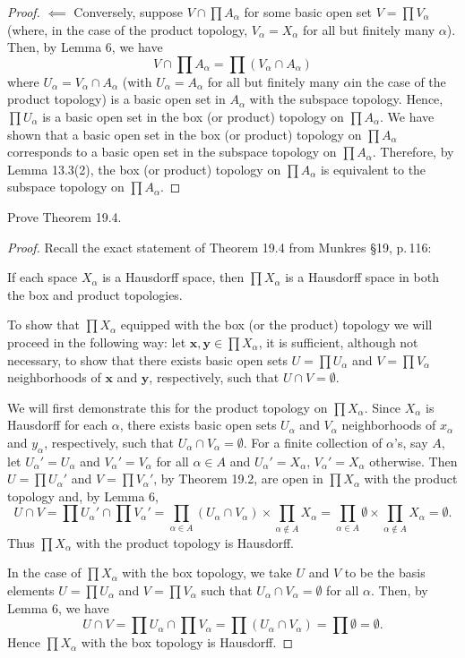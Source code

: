 \begin{proof}
$\impliedby$ Conversely, suppose $V\cap\prod A_\alpha$ for some
basic open set $V=\prod V_\alpha$ (where, in the case of the
product topology, $V_\alpha=X_\alpha$ for all but finitely many
$\alpha$). Then, by Lemma 6, we have
\[
V\cap\prod A_\alpha=\prod\left(V_\alpha\cap A_\alpha\right)
\]
where $U_\alpha=V_\alpha\cap A_\alpha$ (with $U_\alpha=A_\alpha$
for all but finitely many $\alpha$in the case of the product
topology) is a basic open set in $A_\alpha$ with the subspace
topology. Hence, $\prod U_\alpha$ is a basic open set in the
box (or product) topology on $\prod A_\alpha$. We have shown that
a basic open set in the box (or product) topology on $\prod
A_\alpha$ corresponds to a basic open set in the subspace
topology on $\prod A_\alpha$. Therefore, by Lemma 13.3(2), the
box (or product) topology on $\prod A_\alpha$ is equivalent to
the subspace topology on $\prod A_\alpha$.
\end{proof}
\newpage
\begin{problem}[Munkres \S19, p.\,118, \#3]
Prove Theorem 19.4.
\end{problem}
\begin{proof}
Recall the exact statement of Theorem 19.4 from Munkres \S19,
p.\,116:
\begin{theorem*}
If each space $X_\alpha$ is a Hausdorff space, then $\prod
X_\alpha$ is a Hausdorff space in both the box and product
topologies.
\end{theorem*}
To show that $\prod X_\alpha$ equipped with the box (or the
product) topology we will proceed in the following way: let
$\mathbf{x},\mathbf{y}\in\prod X_\alpha$, it is sufficient,
although not necessary, to show that there exists basic open sets
$U=\prod U_\alpha$ and $V=\prod V_\alpha$ neighborhoods of
$\mathbf{x}$ and $\mathbf{y}$, respectively, such that $U\cap
V=\emptyset$.

We will first demonstrate this for the product topology on $\prod
X_\alpha$. Since $X_\alpha$ is Hausdorff for each $\alpha$, there
exists basic open sets $U_\alpha$ and $V_\alpha$ neighborhoods of
$x_\alpha$ and $y_\alpha$, respectively, such that $U_\alpha\cap
V_\alpha=\emptyset$. For a finite collection of $\alpha$'s, say
$A$, let $U_\alpha'=U_\alpha$ and $V_\alpha'=V_\alpha$ for all
$\alpha\in A$ and $U_\alpha'=X_\alpha$, $V_\alpha'=X_\alpha$
otherwise. Then $U=\prod U_\alpha'$ and $V=\prod V_\alpha'$, by
Theorem 19.2, are open in $\prod X_\alpha$ with the product
topology and, by Lemma 6,
\[
U\cap V=\prod U_\alpha'\cap \prod V_\alpha'
=\prod_{\alpha\in A}\left(U_\alpha\cap
  V_\alpha\right)\times\prod_{\alpha\notin A}X_\alpha
=\prod_{\alpha\in A}\emptyset\times\prod_{\alpha\notin A}X_\alpha
=\emptyset.
\]
Thus $\prod X_\alpha$ with the product topology is Hausdorff.

In the case of $\prod X_\alpha$ with the box topology, we take
$U$ and $V$ to be the basis elements $U=\prod U_\alpha$ and
$V=\prod V_\alpha$ such that $U_\alpha\cap V_\alpha=\emptyset$
for all $\alpha$. Then, by Lemma 6, we have
\[
U\cap V=\prod U_\alpha\cap\prod V_\alpha
=\prod \left(U_\alpha\cap V_\alpha\right)
=\prod\emptyset=\emptyset.
\]
Hence $\prod X_\alpha$ with the box topology is Hausdorff.
\end{proof}
